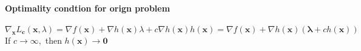 \paragraph{Optimality condtion for orign problem}
\[
\nabla_{\bm x}L_{\bm c}(\bm x,\lambda)=
\nabla f(\bm x)
+
\nabla h(\bm x)\lambda+c\nabla h(\bm x)h(\bm x)
=
\nabla f(\bm x)
+
\nabla h(\bm x)(\bm\lambda+ch(\bm x))
\]
If $c\to\infty,$ then $h(\bm x)\to\bm0$



















